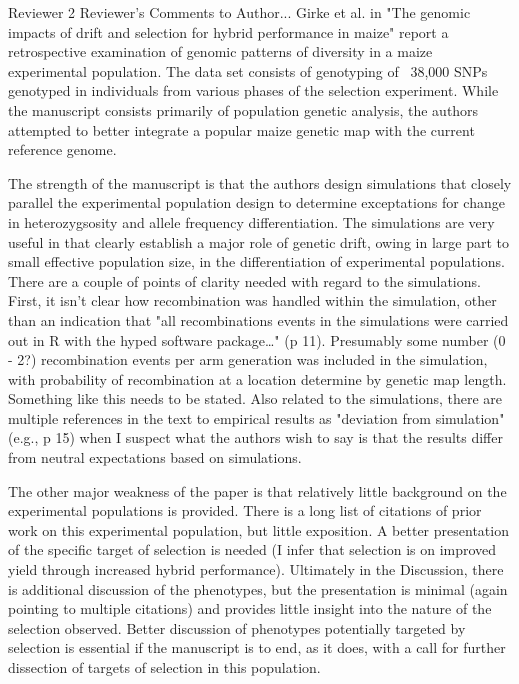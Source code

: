 \documentclass[onecolumn,oneside,letterpaper]{article}
\begin{document}
Reviewer 2 Reviewer's Comments to Author...
Girke et al. in "The genomic impacts of drift and selection for hybrid performance in maize" report a 
retrospective examination of genomic patterns of diversity in a maize experimental population. The data 
set consists of genotyping of ~38,000 SNPs genotyped in individuals from various phases of the selection 
experiment. While the manuscript consists primarily of population genetic analysis, the authors attempted 
to better integrate a popular maize genetic map with the current reference genome.

The strength of the manuscript is that the authors design simulations that closely parallel the experimental 
population design to determine exceptations for change in heterozygsosity and allele frequency 
differentiation. The simulations are very useful in that clearly establish a major role of genetic drift, owing 
in large part to small effective population size, in the differentiation of experimental populations. There are 
a couple of points of clarity needed with regard to the simulations. First, it isn't clear how recombination 
was handled within the simulation, other than an indication that "all recombinations events in the 
simulations were carried out in R with the hyped software package…" (p 11). Presumably some number (0 - 
2?) recombination events per arm generation was included in the simulation, with probability of 
recombination at a location determine by genetic map length. Something like this needs to be stated. Also 
related to the simulations, there are multiple references in the text to empirical results as "deviation from 
simulation" (e.g., p 15) when I suspect what the authors wish to say is that the results differ from neutral 
expectations based on simulations.

The other major weakness of the paper is that relatively little background on the experimental populations 
is provided. There is a long list of citations of prior work on this experimental population, but little 
exposition. A better presentation of the specific target of selection is needed (I infer that selection is on 
improved yield through increased hybrid performance). Ultimately in the Discussion, there is additional 
discussion of the phenotypes, but the presentation is minimal (again pointing to multiple citations) and 
provides little insight into the nature of the selection observed. Better discussion of phenotypes potentially 
targeted by selection is essential if the manuscript is to end, as it does, with a call for further dissection of 
targets of selection in this population.
\end{document}
